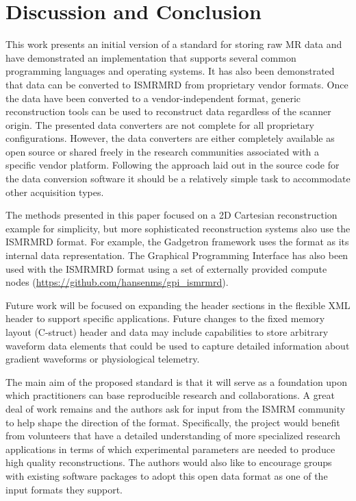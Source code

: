 \documentclass[12pt]{article}
\begin{document}
\section*{Discussion and Conclusion}
This work presents an initial version of a standard for storing raw MR data and have demonstrated an implementation that supports several common programming languages and operating systems. It has also been demonstrated that data can be converted to ISMRMRD from proprietary vendor formats. Once the data have been converted to a vendor-independent format, generic reconstruction tools can be used to reconstruct data regardless of the scanner origin. The presented data converters are not complete for all proprietary configurations. However, the data converters are either completely available as open source or shared freely in the research communities associated with a specific vendor platform. Following the approach laid out in the source code for the data conversion software it should be a relatively simple task to accommodate other acquisition types. 

The methods presented in this paper focused on a 2D Cartesian reconstruction example for simplicity, but more sophisticated reconstruction systems also use the ISMRMRD format. For example, the Gadgetron \cite{Hansen:2013aa} framework uses the format as its internal data representation. The Graphical Programming Interface \cite{Zwart:2014aa} has also been used with the ISMRMRD format using a set of externally provided compute nodes (\url{https://github.com/hansenms/gpi_ismrmrd}).

Future work will be focused on expanding the header sections in the flexible XML header to support specific applications.  Future changes to the fixed memory layout (C-struct) header and data may include capabilities to store arbitrary waveform data elements that could be used to capture detailed information about gradient waveforms or physiological telemetry. 

The main aim of the proposed standard is that it will serve as a foundation upon which practitioners can base reproducible research and collaborations.  A great deal of work remains and the authors ask for input from the ISMRM community to help shape the direction of the format. Specifically, the project would benefit from volunteers that have a detailed understanding of more specialized research applications in terms of which experimental parameters are needed to produce high quality reconstructions. The authors would also like to encourage groups with existing software packages to adopt this open data format as one of the input formats they support. 
\end{document}
